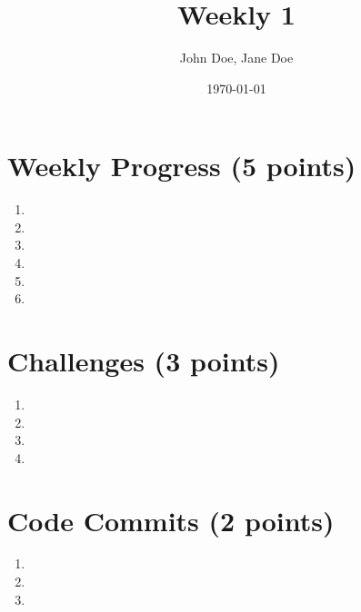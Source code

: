 \documentclass[10pt]{article}
\title{Weekly 1}
\author{John Doe, Jane Doe}
\date{\today}
\begin{document}
\maketitle


\section*{Weekly Progress (5 points)}
\begin{enumerate}
    \item  
    \item 
    \item 
    \item 
    \item 
    \item [more]
\end{enumerate}

\section*{Challenges (3 points)}
\begin{enumerate}
    \item  
    \item 
    \item 
    \item [more]
\end{enumerate}

\section*{Code Commits (2 points)}
\begin{enumerate}
    \item  
    \item 
    \item [more]
\end{enumerate}

\clearpage


\end{document}
